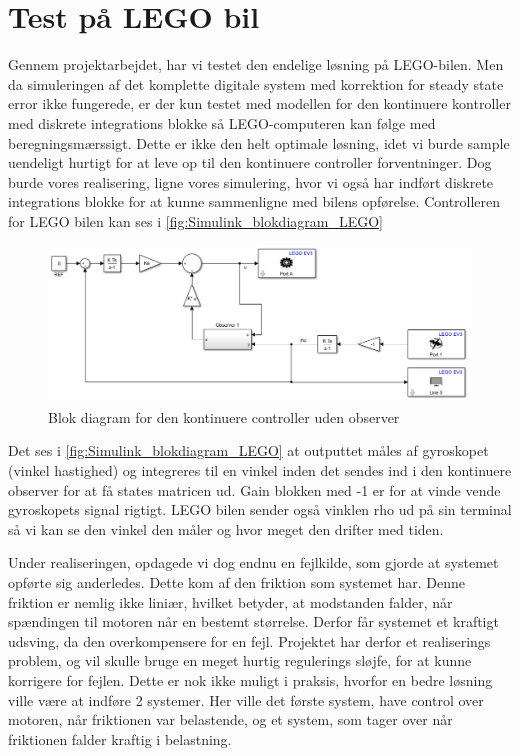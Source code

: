 \section{Test på LEGO bil}

Gennem projektarbejdet, har vi testet den endelige løsning på LEGO-bilen. Men da simuleringen af det komplette digitale system med korrektion for steady state error ikke fungerede, er der kun testet med modellen for den kontinuere kontroller  med diskrete integrations blokke så LEGO-computeren kan følge med beregningsmærssigt. Dette er ikke den helt optimale løsning, idet vi burde sample uendeligt hurtigt for at leve op til den kontinuere controller forventninger. Dog burde vores realisering, ligne vores simulering, hvor vi også har indført diskrete integrations blokke for at kunne sammenligne med bilens opførelse. Controlleren for LEGO bilen kan ses i \autoref{fig:Simulink_blokdiagram_LEGO} 

\begin{figure}[H]
	\centering
	\includegraphics[width = 1\textwidth]{figur/Simulink_blokdiagram_LEGO}
	\caption{Blok diagram for den kontinuere controller uden observer}
	\label{fig:Simulink_blokdiagram_LEGO}
\end{figure}

Det ses i \autoref{fig:Simulink_blokdiagram_LEGO} at outputtet måles af gyroskopet (vinkel hastighed) og integreres til en vinkel inden det sendes ind i den kontinuere observer for at få states matricen ud. Gain blokken med -1 er for at vinde vende gyroskopets signal rigtigt. LEGO bilen sender også vinklen rho ud på sin terminal så vi kan se den vinkel den måler og hvor meget den drifter med tiden.

Under realiseringen, opdagede vi dog endnu en fejlkilde, som gjorde at systemet opførte sig anderledes. Dette kom af den friktion som systemet har. Denne friktion er nemlig ikke liniær, hvilket betyder, at modstanden falder, når spændingen til motoren når en bestemt størrelse. Derfor får systemet et kraftigt udsving, da den overkompensere for en fejl. Projektet har derfor et realiserings problem, og vil skulle bruge en meget hurtig regulerings sløjfe, for at kunne korrigere for fejlen. Dette er nok ikke muligt i praksis, hvorfor en bedre løsning ville være at indføre 2 systemer. Her ville det første system, have control over motoren, når friktionen var belastende, og et system, som tager over når friktionen falder kraftig i belastning.

